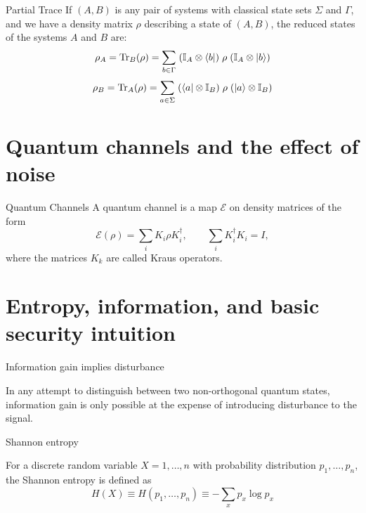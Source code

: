 \documentclass[10pt,aspectratio=169]{beamer}
\begin{document}
\begin{frame}{Partial Trace}
    If $(A, B)$ is any pair of systems with classical state sets $\Sigma$ and $\Gamma$,  and we have a density matrix $\rho$ describing a state of $(A, B)$, the reduced states of the systems $A$ and $B$ are: 
    \[\rho_A = \text{Tr}_B(\rho) = \sum_{b \in \Gamma} \hspace{0.1cm}(\mathbb{I}_A \otimes \bra{b}) \hspace{0.1cm} \rho \hspace{0.1cm}(\mathbb{I}_A \otimes \ket{b})\]
    \[\rho_B = \text{Tr}_A(\rho) = \sum_{a \in \Sigma} \hspace{0.1cm}(\bra{a} \otimes \mathbb{I}_B) \hspace{0.1cm} \rho \hspace{0.1cm}(\ket{a} \otimes \mathbb{I}_B )\]
\end{frame}


\section{Quantum channels and the effect of noise}

\begin{frame}{Quantum Channels}
    A quantum channel is a map $\mathcal{E}$ on density matrices of the form
    \[
    \mathcal{E}(\rho)=\sum_i K_i\rho K_i^\dagger,
    \qquad
    \sum_i K_i^\dagger K_i=I,
    \]
    where the matrices $K_k$ are called Kraus operators.
\end{frame}

\section{Entropy, information, and basic security intuition}

\begin{frame}{Information gain implies disturbance}
  \begin{theorem}
    In any attempt to distinguish between two non-orthogonal quantum states,
    information gain is only possible at the expense of introducing
    disturbance to the signal.
  \end{theorem}
\end{frame}

\begin{frame}{Shannon entropy}
  \begin{definition}
    For a discrete random variable $X=1,\dots,n$ with probability distribution
    $p_1,\dots,p_n$, the Shannon entropy is defined as
    \[H(X) \equiv H(p_1, \dots, p_n) \equiv -\sum_x p_x \log p_x\]
  \end{definition}
\end{frame}
\end{document}
